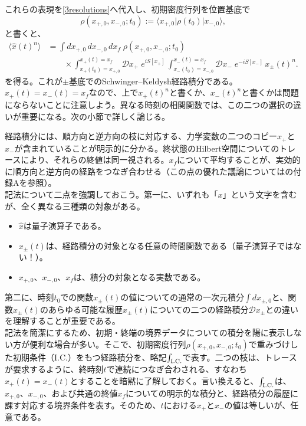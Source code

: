 \documentclass[a4paper,11pt,oneside]{article}
\theoremstyle{definition}
\numberwithin{equation}{section}
\newcommand{\ex}[1]{\langle #1 \rangle}
\begin{document}
これらの表現を\eqref{3resolutions}へ代入し、初期密度行列を位置基底で
\begin{equation}
\rho(x_{+,0},x_{-,0};t_0):=\langle x_{+,0}|\rho(t_0)|x_{-,0}\rangle ,
\end{equation}
と書くと、
\begin{align}
\ex{\hat x(t)^{n}}
&=
\int dx_{+,0}\,dx_{-,0}\,dx_f\;
\rho(x_{+,0},x_{-,0};t_0)
\nonumber\\
&\qquad\times
\int_{x_+(t_0)=x_{+,0}}^{x_+(t)=x_f}\!\!\!\!\!\!\!\!\!\!\!\!\!\! \mathcal D x_+\;
e^{ iS[x_+] } \, \int_{x_-(t_0)=x_{-,0}}^{x_-(t)=x_f}\!\!\!\!\!\!\!\!\!\!\!\!\!\! \mathcal D x_-\;
e^{ -iS[x_-] } \, x_{\pm}(t)^{n}.
\end{align}
を得る。これが$\pm$基底でのSchwinger--Keldysh経路積分である。$ x_{+}(t)=x_{-}(t)=x_{f}$なので、上で$ x_{+}(t)^{n}$と書くか、$ x_{-}(t)^{n}$と書くかは問題にならないことに注意しよう。異なる時刻の相関関数では、この二つの選択の違いが重要になる。次の小節で詳しく論じる。



経路積分には、順方向と逆方向の枝に対応する、力学変数の二つのコピー$x_+$と$x_-$が含まれていることが明示的に分かる。終状態のHilbert空間についてのトレースにより、それらの終値は同一視される。$ x_{f}$について平均することが、実効的に順方向と逆方向の経路をつなぎ合わせる（この点の優れた議論については\cite{Polchinski:1998rq}の付録Aを参照）。\\



記法について二点を強調しておこう。第一に、いずれも「$x $」という文字を含むが、全く異なる三種類の対象がある。
\begin{itemize}
\item $ \hat x$は量子演算子である。
\item $x_{\pm}(t)$は、経路積分の対象となる任意の時間関数である（量子演算子ではない！）。
\item $ x_{+,0}$、$ x_{-,0}$、$ x_{f}$は、積分の対象となる実数である。
\end{itemize}
第二に、時刻$ t_{0}$での関数$ x_{\pm}(t)$の値についての通常の一次元積分$\int dx_{\pm,0} $と、関数$ x_{\pm}(t)$のあらゆる可能な履歴$ x_{\pm}(t)$についての二つの経路積分$ \mathcal{D}x_{\pm}$との違いを理解することが重要である。\\



記法を簡潔にするため、初期・終端の境界データについての積分を陽に表示しない方が便利な場合が多い。そこで、初期密度行列$ \rho(x_{+,0},x_{-,0};t_0) $で重みづけした初期条件（I.C.）をもつ経路積分を、略記\(\int_{\rm I.C.}\)で表す。二つの枝は、トレースが要求するように、終時刻$ t$で連続につなぎ合わされる、すなわち$ x_{+}(t)=x_{-}(t)$とすることを暗黙に了解しておく。言い換えると、\(\int_{\rm I.C.}\)は、\(x_{+,0}\)、\(x_{-,0}\)、および共通の終値\(x_f\)についての明示的な積分と、経路積分の履歴に課す対応する境界条件を表す。そのため、$ t$における$ x_{+}$と$ x_{-}$の値は等しいが、任意である。
\end{document}
